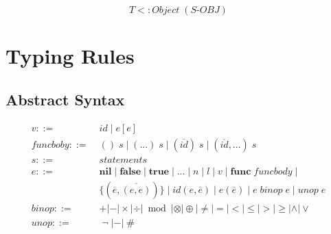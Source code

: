 \documentclass[12pt]{article}
\begin{document}
\[
T <: Object \; (\textit{S-OBJ})
\]

\section{Typing Rules}

\subsection{Abstract Syntax}

\begin{align*}
v ::= \; & id \; | \; e[e]\\
funcboby ::= \; & () \; s \; | \; ({...}) \; s \;
| \; (\overline{id}) \; s \; | \; (\overline{id},{...}) \; s\\
s ::= \; & statements\\
e ::= \; & \textbf{nil} \; | \; \textbf{false} \; | \; \textbf{true} \;
| \; {...} \; | \; n \; | \; l \; | \; v \;
| \; \textbf{func} \; funcbody \; | \\
& \{(\overline{e},\overline{(e,e)})\} \;
| \; id(e,\overline{e}) \; | \; e(\overline{e}) \;
| \; e \; binop \; e \; | \; unop \; e\\
binop ::= & + | - | \times | \div | \bmod | \otimes | \oplus
  | \not= | = | < | \le | > | \ge | \land | \lor\\
unop ::= & \; \lnot \; | - | \; \#\\
\end{align*}
\end{document}

